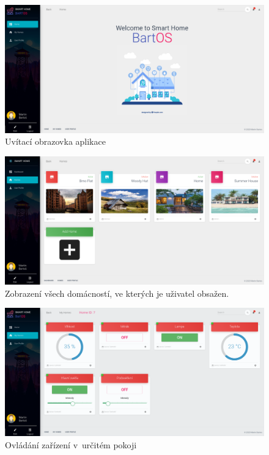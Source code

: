 \begin{figure}[hbt]
    \centering
    \includegraphics[width=1\linewidth]{obrazky-figures/screen/welcome.png}
    \caption{Uvítací obrazovka aplikace}
    \label{fig:screen:home}
\end{figure}

\begin{figure}[hbt]
    \centering
    \includegraphics[width=1\linewidth]{obrazky-figures/actualView.png}
    \caption{Zobrazení všech domácností, ve kterých je uživatel obsažen.}
    \label{fig:screen:homes}
\end{figure}

\begin{figure}[hbt]
    \centering
    \includegraphics[width=1\linewidth]{obrazky-figures/screen/device.png}
    \caption{Ovládání zařízení v~určitém pokoji}
    \label{fig:screen:device}
\end{figure}

